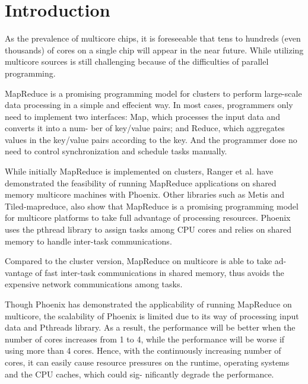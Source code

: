 \section{Introduction}
\label{sec:intro}




As the prevalence of multicore chips,
it is foreseeable
that tens to hundreds (even thousands) of cores on a single chip
will appear in the near future\cite{Borkar2007core}.
While utilizing multicore sources is still challenging
because of the difficulties of parallel programming.

MapReduce\cite{dean2004mapreduce} 
is a promising programming model for clusters
to perform large-scale data processing
in a simple and effecient way.
In most cases, programmers only need to implement two interfaces:
Map, which processes the input data and converts it into a num-
ber of key/value pairs; and Reduce, which aggregates values in the
key/value pairs according to the key.
And the programmer dose no need to control synchronization 
and schedule tasks manually.

While initially MapReduce is implemented on clusters, Ranger
et al. have demonstrated the feasibility of running MapReduce
applications on shared memory multicore machines with 
Phoenix\cite{ranger2007phoenix}.
Other libraries such as Metis\cite{mao2010metis} 
and Tiled-mapreduce\cite{chen2010tiled},
also show that MapReduce is a promising programming model 
for multicore platforms to take full advantage of  
processing resources.
Phoenix uses the pthread library to assign tasks 
among CPU cores and relies on
shared memory to handle inter-task communications.

Compared to the cluster version, MapReduce on multicore is able to take ad-
vantage of fast inter-task communications in shared memory, thus
avoids the expensive network communications among tasks.

Though Phoenix has demonstrated the applicability of running
MapReduce on multicore, the scalability of Phoenix is limited 
due to its way of processing input data and Pthreads library.
As a result, the performance will be better 
when the number of cores increases from 1 to 4, 
while the performance will be worse if using more than 4 cores.  
Hence, with the continuously increasing
number of cores, it can easily cause resource pressures on the
runtime, operating systems and the CPU caches, which could sig-
nificantly degrade the performance. 

